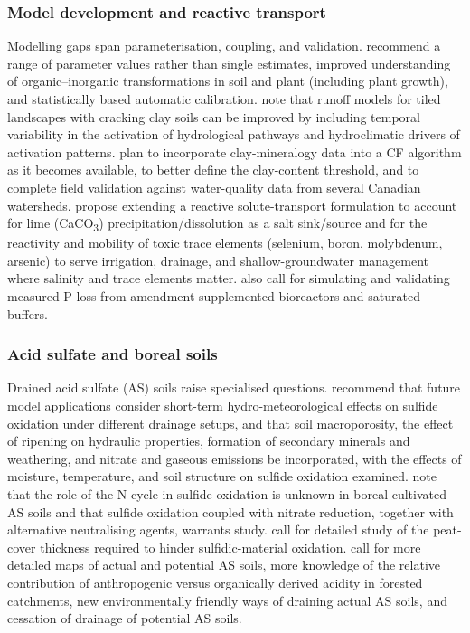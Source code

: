 \documentclass[11pt]{article}
\begin{document}
\subsubsection{Model development and reactive transport}

Modelling gaps span parameterisation, coupling, and validation. \textcite{Conrad2009} recommend a range of parameter values rather than single estimates, improved understanding of organic--inorganic transformations in soil and plant (including plant growth), and statistically based automatic calibration. \textcite{Kokulan2019} note that runoff models for tiled landscapes with cracking clay soils can be improved by including temporal variability in the activation of hydrological pathways and hydroclimatic drivers of activation patterns. \textcite{Dadfar2010} plan to incorporate clay-mineralogy data into a CF algorithm as it becomes available, to better define the clay-content threshold, and to complete field validation against water-quality data from several Canadian watersheds. \textcite{KARAJEH1994c} propose extending a reactive solute-transport formulation to account for lime (CaCO\textsubscript{3}) precipitation/dissolution as a salt sink/source and for the reactivity and mobility of toxic trace elements (selenium, boron, molybdenum, arsenic) to serve irrigation, drainage, and shallow-groundwater management where salinity and trace elements matter. \textcite{Singh2020c} also call for simulating and validating measured P loss from amendment-supplemented bioreactors and saturated buffers.

\subsubsection{Acid sulfate and boreal soils}

Drained acid sulfate (AS) soils raise specialised questions. \textcite{Salo2023} recommend that future model applications consider short-term hydro-meteorological effects on sulfide oxidation under different drainage setups, and that soil macroporosity, the effect of ripening on hydraulic properties, formation of secondary minerals and weathering, and nitrate and gaseous emissions be incorporated, with the effects of moisture, temperature, and soil structure on sulfide oxidation examined. \textcite{Virtanen2017} note that the role of the N cycle in sulfide oxidation is unknown in boreal cultivated AS soils and that sulfide oxidation coupled with nitrate reduction, together with alternative neutralising agents, warrants study. \textcite{YliHalla2022} call for detailed study of the peat-cover thickness required to hinder sulfidic-material oxidation. \textcite{Åström2005} call for more detailed maps of actual and potential AS soils, more knowledge of the relative contribution of anthropogenic versus organically derived acidity in forested catchments, new environmentally friendly ways of draining actual AS soils, and cessation of drainage of potential AS soils.
\end{document}
